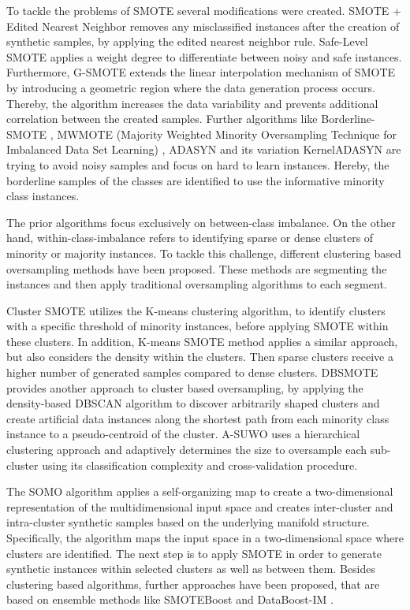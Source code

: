 \documentclass[parskip=full]{scrartcl}
\begin{document}
To tackle the problems of SMOTE several modifications were created. SMOTE + Edited Nearest Neighbor \cite{Batista2004} removes any misclassified instances after the creation of synthetic samples, by applying the edited nearest neighbor rule. Safe-Level SMOTE \cite{Bunkhumpornpat2009} applies a weight degree to differentiate between noisy and safe instances. Furthermore, G-SMOTE \cite{Douzas2019} extends the linear interpolation mechanism of SMOTE by introducing a geometric region where the data generation process occurs. Thereby, the algorithm increases the data variability and prevents additional correlation between the created samples. Further algorithms like Borderline-SMOTE \cite{Han2005}, MWMOTE (Majority Weighted Minority Oversampling Technique for Imbalanced Data Set Learning) \cite{Barua2014}, ADASYN and its variation KernelADASYN \cite{Tang2015} are trying to avoid noisy samples and focus on hard to learn instances. Hereby, the borderline samples of the classes are identified to use the informative minority class instances.

The prior algorithms focus exclusively on between-class imbalance. On the other hand, within-class-imbalance refers to identifying sparse or dense clusters of minority or majority instances. To tackle this challenge, different clustering based oversampling methods have been proposed. These methods are segmenting the instances and then apply traditional oversampling algorithms to each segment.

Cluster SMOTE \cite{Cieslak2006} utilizes the K-means clustering algorithm, to identify clusters with a specific threshold of minority instances, before applying SMOTE within these clusters. In addition, K-means SMOTE \cite{Douzas2018a} method applies a similar approach, but also considers the density within the clusters. Then sparse clusters receive a higher number of generated samples compared to dense clusters. DBSMOTE \cite{Bunkhumpornpat2012} provides another approach to cluster based oversampling, by applying the density-based DBSCAN algorithm to discover arbitrarily shaped clusters and create artificial data instances along the shortest path from each minority class instance to a pseudo-centroid of the cluster. A-SUWO \cite{Nekooeimehr2016} uses a hierarchical clustering approach and adaptively determines the size to oversample each sub-cluster using its classification complexity and cross-validation procedure.

The SOMO algorithm \cite{Douzas2017} applies a self-organizing map to create a two-dimensional representation of the multidimensional input space and creates inter-cluster and intra-cluster synthetic samples based on the underlying manifold structure. Specifically, the algorithm maps the input space in a two-dimensional space where clusters are identified. The next step is to apply SMOTE in order to generate synthetic instances within selected clusters as well as between them. Besides clustering based algorithms, further approaches have been proposed, that are based on ensemble methods like SMOTEBoost \cite{Chawla2003} and DataBoost-IM \cite{Guo2004}.
\end{document}
